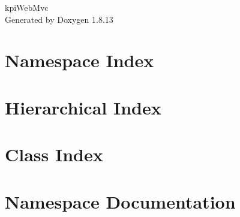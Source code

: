 \documentclass[twoside]{book}
\newcommand{\+}{\discretionary{\mbox{\scriptsize$\hookleftarrow$}}{}{}}
\newcommand{\clearemptydoublepage}{%
  \newpage{\pagestyle{empty}\cleardoublepage}%
}
\begin{document}
\hypersetup{pageanchor=false,
             bookmarksnumbered=true,
             pdfencoding=unicode
            }
\begin{titlepage}
\vspace*{7cm}
\begin{center}%
{\Large kpi\+Web\+Mvc }\\
\vspace*{1cm}
{\large Generated by Doxygen 1.8.13}\\
\end{center}
\end{titlepage}
\clearemptydoublepage
{}
\tableofcontents
\clearemptydoublepage
{}
\hypersetup{pageanchor=true}

\chapter{Namespace Index}

\chapter{Hierarchical Index}

\chapter{Class Index}

\chapter{Namespace Documentation}




\end{document}
